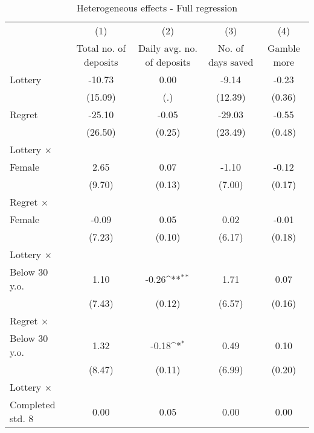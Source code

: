 \begin{table}[htbp]\centering
\def\sym#1{\ifmmode^{#1}\else\(^{#1}\)\fi}
\caption{Heterogeneous effects - Full regression}
\begin{tabular}{l*{4}{c}}
\toprule
                &\multicolumn{1}{c}{(1)}&\multicolumn{1}{c}{(2)}&\multicolumn{1}{c}{(3)}&\multicolumn{1}{c}{(4)}\\
                &\multicolumn{1}{c}{Total no. of deposits}&\multicolumn{1}{c}{Daily avg. no. of deposits}&\multicolumn{1}{c}{No. of days saved}&\multicolumn{1}{c}{Gamble more}\\
\midrule
Lottery         &   -10.73         &     0.00         &    -9.14         &    -0.23         \\
                &  (15.09)         &      (.)         &  (12.39)         &   (0.36)         \\
\addlinespace
Regret          &   -25.10         &    -0.05         &   -29.03         &    -0.55         \\
                &  (26.50)         &   (0.25)         &  (23.49)         &   (0.48)         \\
\addlinespace
Lottery $\times$ \\ Female&     2.65         &     0.07         &    -1.10         &    -0.12         \\
                &   (9.70)         &   (0.13)         &   (7.00)         &   (0.17)         \\
\addlinespace
Regret $\times$ \\ Female&    -0.09         &     0.05         &     0.02         &    -0.01         \\
                &   (7.23)         &   (0.10)         &   (6.17)         &   (0.18)         \\
\addlinespace
Lottery $\times$ \\ Below 30 y.o.&     1.10         &    -0.26\sym{**} &     1.71         &     0.07         \\
                &   (7.43)         &   (0.12)         &   (6.57)         &   (0.16)         \\
\addlinespace
Regret $\times$ \\ Below 30 y.o.&     1.32         &    -0.18\sym{*}  &     0.49         &     0.10         \\
                &   (8.47)         &   (0.11)         &   (6.99)         &   (0.20)         \\
\addlinespace
Lottery $\times$ \\ Completed std. 8&     0.00         &     0.05         &     0.00         &     0.00         \\

\end{tabular}
\end{table}
